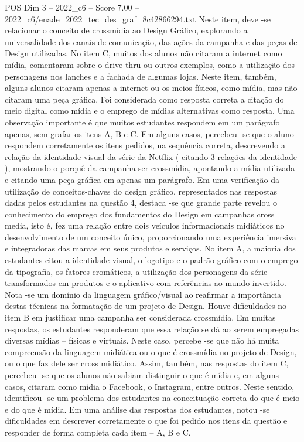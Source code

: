 \begin{textsample}{POS Dim 3 – 2022\_c6 – Score 7.00 – 2022\_c6/enade\_2022\_tec\_des\_graf\_8c42866294.txt}
Neste item, deve -se relacionar o conceito de crossmídia ao Design Gráfico, explorando a universalidade dos canais de comunicação, das ações da campanha e das peças de Design utilizadas.
No item C, muitos dos alunos não citaram a internet como mídia, comentaram sobre o drive-thru ou outros exemplos, como a utilização dos personagens nos lanches e a fachada de algumas lojas.
Neste item, também, alguns alunos citaram apenas a internet ou os meios físicos, como mídia, mas não citaram uma peça gráfica.
Foi considerada como resposta correta a citação do meio digital como mídia e o emprego de mídias alternativas como resposta.
Uma observação importante é que muitos estudantes respondem em um parágrafo apenas, sem grafar os itens A, B e C.
Em alguns casos, percebeu -se que o aluno respondem corretamente os itens pedidos, na sequência correta, descrevendo a relação da identidade visual da série da Netflix ( citando 3 relações da identidade ), mostrando o porquê da campanha ser crossmídia, apontando a mídia utilizada e citando uma peça gráfica em apenas um parágrafo.
Em uma verificação da utilização de conceitos-chaves do design gráfico, representados nas respostas dadas pelos estudantes na questão 4, destaca -se que grande parte revelou o conhecimento do emprego dos fundamentos do Design em campanhas cross media, isto é, fez uma relação entre dois veículos informacionais midiáticos no desenvolvimento de um conceito único, proporcionando uma experiência imersiva e integradoras das marcas em seus produtos e serviços.
No item A, a maioria dos estudantes citou a identidade visual, o logotipo e o padrão gráfico com o emprego da tipografia, os fatores cromáticos, a utilização dos personagens da série transformados em produtos e o aplicativo com referências ao mundo invertido.
Nota -se um domínio da linguagem gráfico/visual ao reafirmar a importância destas técnicas na formatação de um projeto de Design.
Houve dificuldades no item B em justificar uma campanha ser considerada crossmídia.
Em muitas respostas, os estudantes responderam que essa relação se dá ao serem empregadas diversas mídias – físicas e virtuais.
Neste caso, percebe -se que não há muita compreensão da linguagem midiática ou o que é crossmídia no projeto de Design, ou o que faz dele ser cross midiático.
Assim, também, nas respostas do item C, percebeu -se que os alunos não sabiam distinguir o que é mídia e, em alguns casos, citaram como mídia o Facebook, o Instagram, entre outros.
Neste sentido, identificou -se um problema dos estudantes na conceituação correta do que é meio e do que é mídia.
Em uma análise das respostas dos estudantes, notou -se dificuldades em descrever corretamente o que foi pedido nos itens da questão e responder de forma completa cada item – A, B e C.

\end{textsample}
